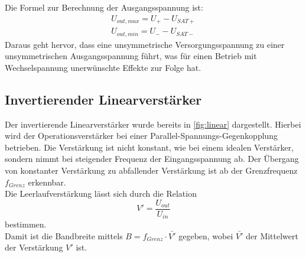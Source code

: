 Die Formel zur Berechnung der Ausgangsspannung ist:
\begin{equation}
    \begin{aligned}
        U_{out,max} = U_{+} - U_{SAT+}\\
        U_{out,min} = U_{-} - U_{SAT-}
    \end{aligned}
\end{equation}
Daraus geht hervor, dass eine unsymmetrische Versorgungsspannung zu einer unsymmetrischen Ausgangsspannung führt, was für einen Betrieb mit Wechselspannung unerwünschte Effekte zur Folge hat.\\

\subsection{Invertierender Linearverstärker}
Der invertierende Linearverstärker wurde bereits in \autoref{fig:linear} dargestellt.
Hierbei wird der Operationsverstärker bei einer Parallel-Spannungs-Gegenkopplung betrieben.
Die Verstärkung ist nicht konstant, wie bei einem idealen Verstärker, sondern nimmt bei steigender Frequenz der Eingangsspannung ab.
Der Übergang von konstanter Verstärkung zu abfallender Verstärkung ist ab der Grenzfrequenz $f_{Grenz}$ erkennbar.\\
Die Leerlaufverstärkung lässt sich durch die Relation
\begin{equation}
    V' = \frac{U_{out}}{U_{in}}
    \label{eq:ampli}
\end{equation}
bestimmen.\\
Damit ist die Bandbreite mittels $B=f_{Grenz}\cdot \bar{V'}$ gegeben, wobei $\bar{V'}$ der Mittelwert der Verstärkung $V'$ ist.

